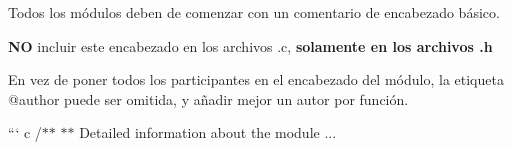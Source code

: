 \begin{DoxyItemize}
\item Todos los módulos deben de comenzar con un comentario de encabezado básico.
\item {\bfseries NO} incluir este encabezado en los archivos {\ttfamily .c}, {\bfseries solamente en los archivos {\ttfamily .h}}
\item En vez de poner todos los participantes en el encabezado del módulo, la etiqueta {\ttfamily @author} puede ser omitida, y añadir mejor un autor por función.
\end{DoxyItemize}

``` c /$\ast$$\ast$ $\ast$$\ast$ Detailed information about the module ...
\begin{DoxyItemize}
\item 
\item 
\end{DoxyItemize}